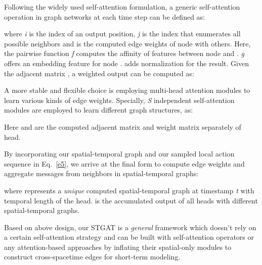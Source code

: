 \documentclass[runningheads]{llncs}
\begin{document}
Following the widely used self-attention formulation, a generic self-attention operation in graph networks at each time step can be defined as:

where \textit{i} is the index of an output position, \textit{j} is the index that enumerates all possible neighbors and  is the computed edge weights of node \textit{} with others. Here, the pairwise function \textit{f} computes the affinity of features between node \textit{} and \textit{}. \textit{g} offers an embedding feature for node \textit{}.  adds normalization for the result. Given the adjacent matrix , a weighted output  can be computed as:
  

A more stable and flexible choice is employing multi-head attention modules to learn various kinds of edge weights. Specially, \textit{S} independent self-attention modules are employed to learn different graph structures, as:

Here  and  are the computed adjacent matrix and weight matrix separately of  head. 
  
By incorporating our spatial-temporal graph  and our sampled local action sequence  in Eq.~\ref{e5}, we arrive at the final form to compute edge weights and aggregate messages from neighbors in spatial-temporal graphs:

where  represents a \textit{unique} computed spatial-temporal graph at timestamp \textit{t} with temporal length  of the  head.  is the accumulated output of all heads with different spatial-temporal graphs. 
  
Based on above design, our STGAT is a \textit{general} framework which doesn't rely on a certain self-attention strategy and can be built with self-attention operators or any attention-based approaches by inflating their spatial-only modules to construct cross-spacetime edges for short-term modeling. 
 
\end{document}
